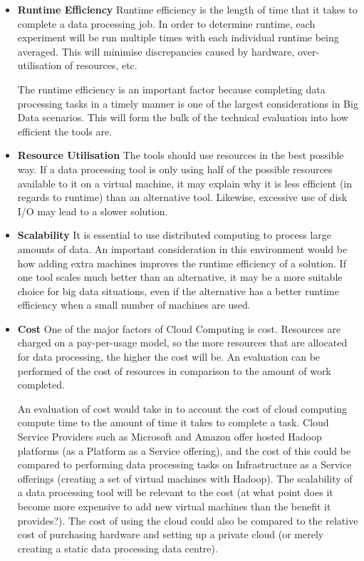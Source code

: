 \begin{itemize}
    \item \textbf{Runtime Efficiency}
    Runtime efficiency is the length of time that it takes to complete a data processing job. In order to determine runtime, each experiment will be run multiple times with each individual runtime being averaged. This will minimise discrepancies caused by hardware, over-utilisation of resources, etc. 

    The runtime efficiency is an important factor because completing data processing tasks in a timely manner is one of the largest considerations in Big Data scenarios. This will form the bulk of the technical evaluation into how efficient the tools are.

    \item \textbf{Resource Utilisation}
    The tools should use resources in the best possible way. If a data processing tool is only using half of the possible resources available to it on a virtual machine, it may explain why it is less efficient (in regards to runtime) than an alternative tool. Likewise, excessive use of disk I/O may lead to a slower solution.

    \item \textbf{Scalability}
    It is essential to use distributed computing to process large amounts of data. An important consideration in this environment would be how adding extra machines improves the runtime efficiency of a solution. If one tool scales much better than an alternative, it may be a more suitable choice for big data situations, even if the alternative has a better runtime efficiency when a small number of machines are used. 

    \item \textbf{Cost}
    One of the major factors of Cloud Computing is cost. Resources are charged on a pay-per-usage model, so the more resources that are allocated for data processing, the higher the cost will be. An evaluation can be performed of the cost of resources in comparison to the amount of work completed. 

    An evaluation of cost would take in to account the cost of cloud computing compute time to the amount of time it takes to complete a task. Cloud Service Providers such as Microsoft and Amazon offer hosted Hadoop platforms (as a Platform as a Service offering), and the cost of this could be compared to performing data processing tasks on Infrastructure as a Service offerings (creating a set of virtual machines with Hadoop). The scalability of a data processing tool will be relevant to the cost (at what point does it become more expensive to add new virtual machines than the benefit it provides?). The cost of using the cloud could also be compared to the relative cost of purchasing hardware and setting up a private cloud (or merely creating a static data processing data centre). 
\end{itemize}

